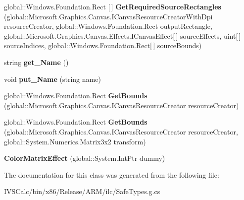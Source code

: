 \begin{DoxyCompactItemize}
global\+::\+Windows.\+Foundation.\+Rect \mbox{[}$\,$\mbox{]} {\bfseries Get\+Required\+Source\+Rectangles} (global\+::\+Microsoft.\+Graphics.\+Canvas.\+I\+Canvas\+Resource\+Creator\+With\+Dpi resource\+Creator, global\+::\+Windows.\+Foundation.\+Rect output\+Rectangle, global\+::\+Microsoft.\+Graphics.\+Canvas.\+Effects.\+I\+Canvas\+Effect\mbox{[}$\,$\mbox{]} source\+Effects, uint\mbox{[}$\,$\mbox{]} source\+Indices, global\+::\+Windows.\+Foundation.\+Rect\mbox{[}$\,$\mbox{]} source\+Bounds)
\item 
\mbox{\label{class_microsoft_1_1_graphics_1_1_canvas_1_1_effects_1_1_color_matrix_effect_aedf9c5d8b501943240da1bdfbe0248ad}} 
string {\bfseries get\+\_\+\+Name} ()
\item 
\mbox{\label{class_microsoft_1_1_graphics_1_1_canvas_1_1_effects_1_1_color_matrix_effect_a4495cce690024c06964968eaabe98f69}} 
void {\bfseries put\+\_\+\+Name} (string name)
\item 
\mbox{\label{class_microsoft_1_1_graphics_1_1_canvas_1_1_effects_1_1_color_matrix_effect_a68840abf9d46043f10ca1f360b2ddcba}} 
global\+::\+Windows.\+Foundation.\+Rect {\bfseries Get\+Bounds} (global\+::\+Microsoft.\+Graphics.\+Canvas.\+I\+Canvas\+Resource\+Creator resource\+Creator)
\item 
\mbox{\label{class_microsoft_1_1_graphics_1_1_canvas_1_1_effects_1_1_color_matrix_effect_a0e2f82cd686772845a245ad6d4195b00}} 
global\+::\+Windows.\+Foundation.\+Rect {\bfseries Get\+Bounds} (global\+::\+Microsoft.\+Graphics.\+Canvas.\+I\+Canvas\+Resource\+Creator resource\+Creator, global\+::\+System.\+Numerics.\+Matrix3x2 transform)
\item 
\mbox{\label{class_microsoft_1_1_graphics_1_1_canvas_1_1_effects_1_1_color_matrix_effect_a0961cd0876bc2b7499a3e547f7418c29}} 
{\bfseries Color\+Matrix\+Effect} (global\+::\+System.\+Int\+Ptr dummy)
\end{DoxyCompactItemize}


The documentation for this class was generated from the following file\+:\begin{DoxyCompactItemize}
\item 
I\+V\+S\+Calc/bin/x86/\+Release/\+A\+R\+M/ilc/Safe\+Types.\+g.\+cs\end{DoxyCompactItemize}
